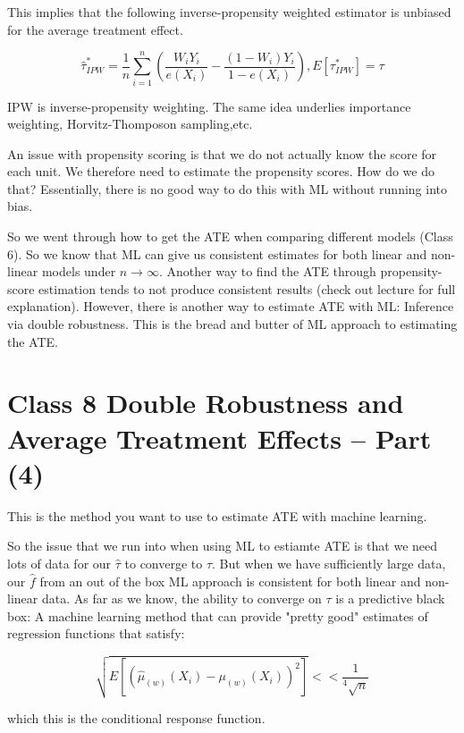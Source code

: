 \documentclass{article}
\begin{document}
This implies that the following inverse-propensity weighted estimator is unbiased for the average treatment effect.

\begin{equation}
    \hat{\tau}^*_{IPW} = \frac{1}{n} \sum_{i=1}^n (\frac{W_i Y_i}{e(X_i)} - \frac{(1-W_i) Y_i}{1 - e(X_i)}) , E [\tau^*_{IPW}] = \tau
\end{equation}

IPW is inverse-propensity weighting. The same idea underlies importance weighting, Horvitz-Thomposon sampling,etc.

An issue with propensity scoring is that we do not actually know the score for each unit. We therefore need to estimate the propensity scores. How do we do that? Essentially, there is no good way to do this with ML without running into bias. 

So we went through how to get the ATE when comparing different models (Class 6). So we know that ML can give us consistent estimates for both linear and non-linear models under $n \rightarrow \infty$. Another way to find the ATE through propensity-score estimation tends to not produce consistent results (check out lecture for full explanation). However, there is another way to estimate ATE with ML: Inference via double robustness. This is the bread and butter of ML approach to estimating the ATE.

\section{Class 8 Double Robustness and Average Treatment Effects -- Part (4)}

This is the method you want to use to estimate ATE with machine learning.

So the issue that we run into when using ML to estiamte ATE is that we need lots of data for our $\hat{\tau}$ to converge to $\tau$. But when we have sufficiently large data, our $\hat{f}$ from an out of the box ML approach is consistent for both linear and non-linear data. As far as we know, the ability to converge on $\tau$ is a predictive black box: A machine learning method that can provide "pretty good" estimates of regression functions that satisfy:

\begin{equation}
    \sqrt{E[ (\hat{\mu}_{(w)}(X_i) - \mu_{(w)}(X_i))^2  ]} << \frac{1}{^4\sqrt{n}}
\end{equation}

which this is the conditional response function.
\end{document}

